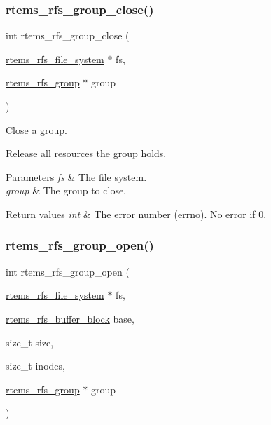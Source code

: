 \subsubsection{\texorpdfstring{rtems\_rfs\_group\_close()}{rtems\_rfs\_group\_close()}}
{\footnotesize\ttfamily int rtems\+\_\+rfs\+\_\+group\+\_\+close (\begin{DoxyParamCaption}\item[{\mbox{\hyperlink{struct__rtems__rfs__file__system}{rtems\+\_\+rfs\+\_\+file\+\_\+system}} $\ast$}]{fs,  }\item[{\mbox{\hyperlink{group__rtems__rfs_ga0e7b27c60e21039ef07a8c843fa8a3e5}{rtems\+\_\+rfs\+\_\+group}} $\ast$}]{group }\end{DoxyParamCaption})}



Close a group. 

Release all resources the group holds.


\begin{DoxyParams}{Parameters}
{\em fs} & The file system. \\
\hline
{\em group} & The group to close. \\
\hline
\end{DoxyParams}

\begin{DoxyRetVals}{Return values}
{\em int} & The error number (errno). No error if 0. \\
\hline
\end{DoxyRetVals}
\mbox{\label{group__rtems__rfs_gac8ab81ba00e5100d7f755ff951b28a83}} 
\subsubsection{\texorpdfstring{rtems\_rfs\_group\_open()}{rtems\_rfs\_group\_open()}}
{\footnotesize\ttfamily int rtems\+\_\+rfs\+\_\+group\+\_\+open (\begin{DoxyParamCaption}\item[{\mbox{\hyperlink{struct__rtems__rfs__file__system}{rtems\+\_\+rfs\+\_\+file\+\_\+system}} $\ast$}]{fs,  }\item[{\mbox{\hyperlink{rtems-rfs-buffer_8h_a5650d53328a5af0a78198fe780aec043}{rtems\+\_\+rfs\+\_\+buffer\+\_\+block}}}]{base,  }\item[{size\+\_\+t}]{size,  }\item[{size\+\_\+t}]{inodes,  }\item[{\mbox{\hyperlink{group__rtems__rfs_ga0e7b27c60e21039ef07a8c843fa8a3e5}{rtems\+\_\+rfs\+\_\+group}} $\ast$}]{group }\end{DoxyParamCaption})}



